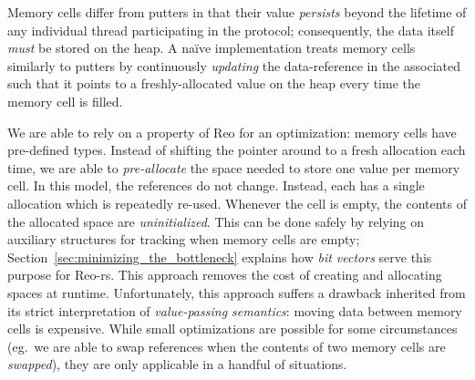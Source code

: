 Memory cells differ from putters in that their value \textit{persists} beyond the lifetime of any individual thread participating in the protocol; consequently, the data itself \textit{must} be stored on the heap. A na\"ive implementation treats memory cells similarly to putters by continuously \textit{updating} the data-reference in the associated  such that it points to a freshly-allocated value on the heap every time the memory cell is filled.

We are able to rely on a property of Reo for an optimization: memory cells have pre-defined types. Instead of shifting the pointer around to a fresh allocation each time, we are able to \textit{pre-allocate} the space needed to store one value per memory cell. In this model, the references do not change. Instead, each has a single allocation which is repeatedly re-used. Whenever the cell is empty, the contents of the allocated space are \textit{uninitialized}. This can be done safely by relying on auxiliary structures for tracking when memory cells are empty; Section~\ref{sec:minimizing_the_bottleneck} explains how \textit{bit vectors} serve this purpose for Reo-rs. This approach removes the cost of creating and allocating spaces at runtime. Unfortunately, this approach suffers a drawback inherited from its strict interpretation of \textit{value-passing semantics}: moving data between memory cells is expensive. While small optimizations are possible for some circumstances (eg.\ we are able to swap references when the contents of two memory cells are \textit{swapped}), they are only applicable in a handful of situations. 

